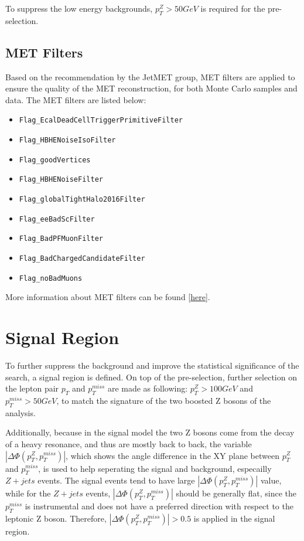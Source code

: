 \vspace{0.3cm}
To suppress the low energy backgrounds, $p_T ^Z > 50GeV$ is required for the pre-selection.


\subsection{MET Filters}
Based on the recommendation by the JetMET group, MET filters are applied to ensure the quality of the MET reconstruction, for both Monte Carlo samples and data. The MET filters are listed below:
\begin{itemize}
\item \texttt{Flag\_EcalDeadCellTriggerPrimitiveFilter}
\item \texttt{Flag\_HBHENoiseIsoFilter}
\item \texttt{Flag\_goodVertices}
\item \texttt{Flag\_HBHENoiseFilter}
\item \texttt{Flag\_globalTightHalo2016Filter}
\item \texttt{Flag\_eeBadScFilter}
\item \texttt{Flag\_BadPFMuonFilter}
\item \texttt{Flag\_BadChargedCandidateFilter}
\item \texttt{Flag\_noBadMuons}
\end{itemize} 

More information about MET filters can be found [\href{https://twiki.cern.ch/twiki/bin/viewauth/CMS/MissingETOptionalFiltersRun2?rev=103}{here}].

\section{Signal Region}\label{sec:selection_sr}
To further suppress the background and improve the statistical significance of the search, a signal region is defined. On top of the pre-selection, further selection on the lepton pair $p_T$ and $p_T ^{miss}$ are made as following: $p_T ^Z > 100GeV$ and $p_T ^{miss} > 50GeV$, to match the signature of the two boosted Z bosons of the analysis. 

\vspace{0.3cm}
Additionally, because in the signal model the two Z bosons come from the decay of a heavy resonance, and thus are mostly back to back, the variable $|\Delta \Phi (p_T ^Z ,p_T ^{miss})|$, which shows the angle difference in the XY plane between $p_T ^Z$ and $p_T ^{miss}$, is used to help seperating the signal and background, especailly $Z+jets$ events. The signal events tend to have large $|\Delta \Phi (p_T ^Z ,p_T ^{miss})|$ value, while for the $Z+jets$ events, $|\Delta \Phi (p_T ^Z ,p_T ^{miss})|$ should be generally flat, since the $p_T ^{miss}$ is instrumental and does not have a preferred direction with respect to the leptonic Z boson. Therefore, $|\Delta \Phi (p_T ^Z ,p_T ^{miss})|>0.5$ is applied in the signal region. 

